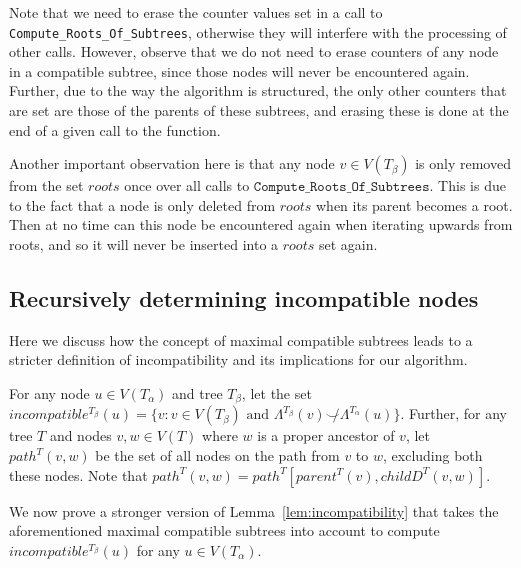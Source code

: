 \documentclass{article}
\newcommand{\compatible}{\smile}
\newcommand{\leafset}{\Lambda}
\newcommand{\TA}{T_\alpha}
\newcommand{\TB}{T_\beta}
\begin{document}
    Note that we need to erase the counter values set in a call to \texttt{Compute\_Roots\_Of\_Subtrees}, otherwise they will interfere with the processing of other calls. However, observe that we do not need to erase counters of any node in a compatible subtree, since those nodes will never be encountered again. Further, due to the way the algorithm is structured, the only other counters that are set are those of the parents of these subtrees, and erasing these is done at the end of a given call to the function.

    Another important observation here is that any node $v \in V(\TB)$ is only removed from the set $roots$ once over all calls to $\texttt{Compute\_Roots\_Of\_Subtrees}$. This is due to the fact that a node is only deleted from $roots$ when its parent becomes a root. Then at no time can this node be encountered again when iterating upwards from roots, and so it will never be inserted into a $roots$ set again.

    \subsection{Recursively determining incompatible nodes}
    \label{subsec:incompatibilityrecursive}

    Here we discuss how the concept of maximal compatible subtrees leads to a stricter definition of incompatibility and its implications for our algorithm.

    For any node $u \in V(\TA)$ and tree $\TB$, let the set $incompatible^{\TB}(u) = \{v : v \in V(\TB) \text{ and } \leafset^{\TB}(v) \not\compatible \leafset^{\TA}(u)\}$. Further, for any tree $T$ and nodes $v, w \in V(T)$ where $w$ is a proper ancestor of $v$, let $path^T(v, w)$ be the set of all nodes on the path from $v$ to $w$, excluding both these nodes. Note that $path^T(v, w) = path^T[parent^T(v), childD^T(v, w)]$.

    We now prove a stronger version of Lemma~\ref{lem:incompatibility} that takes the aforementioned maximal compatible subtrees into account to compute $incompatible^{\TB}(u)$ for any $u \in V(\TA)$.
    \newline
\end{document}
